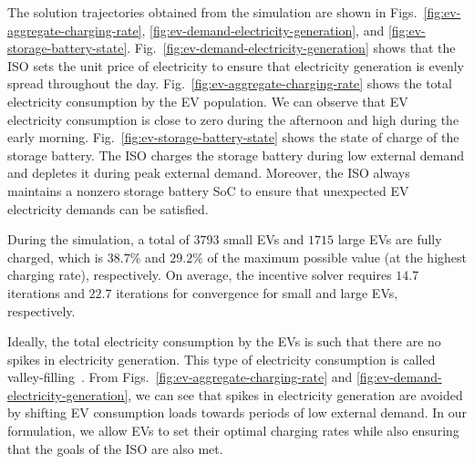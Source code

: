 The solution trajectories obtained from the simulation are shown in Figs.~\ref{fig:ev-aggregate-charging-rate}, \ref{fig:ev-demand-electricity-generation}, and \ref{fig:ev-storage-battery-state}.
Fig.~\ref{fig:ev-demand-electricity-generation} shows that the ISO sets the unit price of electricity to ensure that electricity generation is evenly spread throughout the day.
Fig.~\ref{fig:ev-aggregate-charging-rate} shows the total electricity consumption by the EV population.
We can observe that EV electricity consumption is close to zero during the afternoon and high during the early morning.
Fig.~\ref{fig:ev-storage-battery-state} shows the state of charge of the storage battery.
The ISO charges the storage battery during low external demand and depletes it during peak external demand.
Moreover, the ISO always maintains a nonzero storage battery SoC to ensure that unexpected EV electricity demands can be satisfied.

During the simulation, a total of $3793$ small EVs and $1715$ large EVs are fully charged, which is $38.7\%$ and $29.2\%$ of the maximum possible value (at the highest charging rate), respectively.
On average, the incentive solver requires $14.7$ iterations and $22.7$ iterations for convergence for small and large EVs, respectively.

Ideally, the total electricity consumption by the EVs is such that there are no spikes in electricity generation.
This type of electricity consumption is called valley-filling~\cite{ma2013decentralized,zou2017efficient}.
From Figs.~\ref{fig:ev-aggregate-charging-rate} and \ref{fig:ev-demand-electricity-generation}, we can see that spikes in electricity generation are avoided by shifting EV consumption loads towards periods of low external demand.
In our formulation, we allow EVs to set their optimal charging rates while also ensuring that the goals of the ISO are also met.
